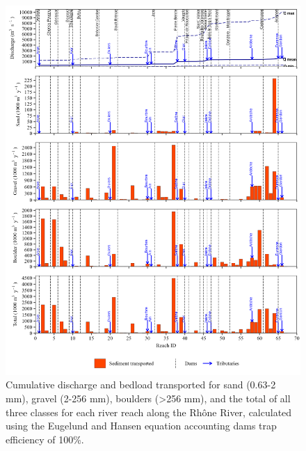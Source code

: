 \documentclass[
]{book}
\begin{document}
\begin{figure}
\includegraphics[width=26.24in]{img/res_cascade/res_E3_eE&H/plots_transp-silt/transp_res_sum_hy_E3_eE&H} \caption{Cumulative discharge and bedload transported for sand (0.63-2 mm), gravel (2-256 mm), boulders (>256 mm), and the total of all three classes for each river reach along the Rhône River, calculated using the Eugelund and Hansen equation accounting dams trap efficiency of 100\%.}\label{fig:TrE3eE}
\end{figure}
\end{document}
